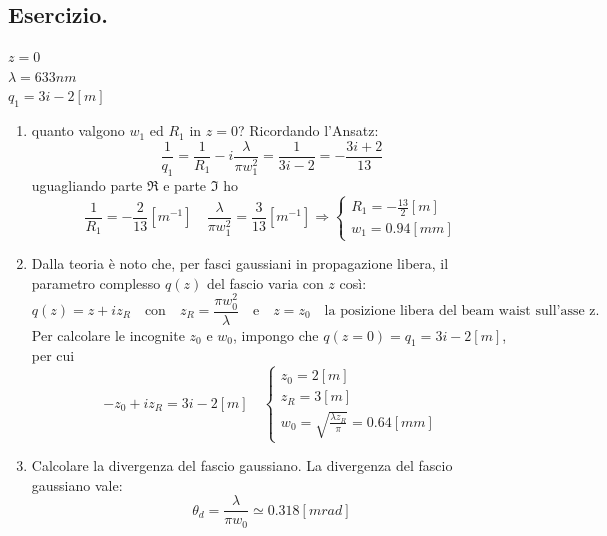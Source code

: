 \documentclass{book}
\def \l {\lambda}
\theoremstyle{remark}
\begin{document}
\subsection{Esercizio.}
$z=0$\\
$\l = 633 nm$\\
$q_1 = 3i -2 [m]$\\
\begin{enumerate}
\item quanto valgono $w_1$ ed $R_1$ in $z=0$?
Ricordando l'Ansatz:
\begin{equation*}
\frac{1}{q_1} = \frac{1}{R_1} -i\frac{\l}{\pi w_1^2} = \frac{1}{3i - 2}= -\frac{3i + 2}{13}
\end{equation*}
uguagliando parte $\Re$ e parte $\Im$ ho
\begin{equation*}
\frac{1}{R_1} = -\frac{2}{13} [m^{-1}] \quad \frac{\l}{\pi w_1^2} = \frac{3}{13} [m^{-1}] \Rightarrow \begin{cases}
R_1 = -\frac{13}{2} [m]\\
w_1 = 0.94 [mm]
\end{cases}
\end{equation*}
\item Dalla teoria è noto che, per fasci gaussiani in propagazione libera, il parametro complesso $q(z)$ del fascio varia con $z$ così:
\begin{equation*}
q(z) = z + iz_R \quad \text{con} \quad z_R = \frac{\pi w_0^2}{\l} \quad \text{e} \quad z = z_0 \quad \text{la posizione libera del beam waist sull'asse z.}
\end{equation*}
Per calcolare le incognite $z_0$ e $w_0$, impongo che $q(z=0) = q_1 = 3i -2 [m]$, per cui
\begin{equation*}
-z_0 + iz_R = 3i -2 [m] \quad \begin{cases}
z_0 = 2 [m]\\
z_R = 3 [m]\\
w_0 = \sqrt{\frac{\l z_R}{\pi}} = 0.64 [mm]
\end{cases}
\end{equation*}
\item Calcolare la divergenza del fascio gaussiano.
La divergenza del fascio gaussiano vale:
\begin{equation*}
\theta_d = \frac{\l}{\pi w_0} \simeq 0.318 [mrad]
\end{equation*}
\end{enumerate}
\end{document}
